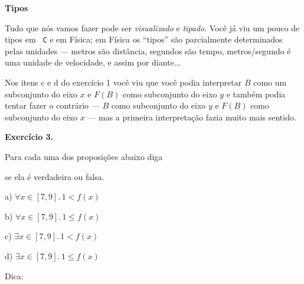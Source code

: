 \documentclass[oneside,12pt]{article}
\begin{document}
\newpage

%

{\bf Tipos}

\ssk

Tudo que nós vamos fazer  pode ser {\sl
  visualizado} e {\sl tipado}. Você já viu um pouco de tipos em {\tt
  C} e em Física; em Física os ``tipos'' são parcialmente determinados
pelas unidades --- metros são distância, segundos são tempo,
metros/segundo é uma unidade de velocidade, e assim por diante...


Nos itens c e d do exercício 1 você viu que você podia interpretar $B$
como um subconjunto do eixo $x$ e $F(B)$ como subconjunto do eixo $y$
e também podia tentar fazer o contrário --- $B$ como subconjunto do
eixo $y$ e $F(B)$ como subconjunto do eixo $x$ --- mas a primeira
interpretação fazia muito mais sentido.

\newpage

%                                                 

{\bf Exercício 3.}

Para cada uma dos proposições abaixo diga

se ela é verdadeira ou falsa.

a) $∀x∈[7,9]. \, 1<f(x)$

b) $∀x∈[7,9]. \, 1≤f(x)$

c) $∃x∈[7,9]. \, 1<f(x)$

d) $∃x∈[7,9]. \, 1≤f(x)$


\msk

Dica:

\def\pex{\smtt{ponto no}{eixo $x$}}
\def\pey{\smtt{ponto no}{eixo $y$}}
\def\iex{\smtt{intervalo}{no eixo $x$}}
\def\iey{\smtt{intervalo}{no eixo $y$}}
\def\sex{\smtt{subconjunto}{do eixo $x$}}
\def\sey{\smtt{subconjunto}{do eixo $y$}}
\end{document}
